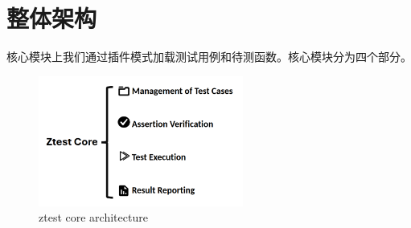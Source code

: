 \documentclass[chinese]{article}
\begin{document}


\newpage
\section{整体架构}
核心模块上我们通过插件模式加载测试用例和待测函数。核心模块分为四个部分。
\begin{figure}[H]
    \centering
    \includegraphics[width=0.6\textwidth]{img/ztest.png} %
    \caption{ ztest core architecture}
    \label{fig:ztest core architecture}
\end{figure}
\end{document}
